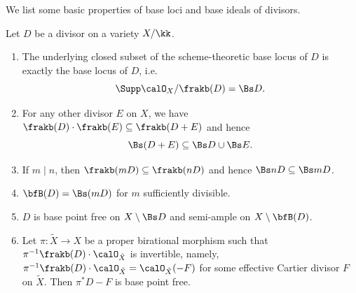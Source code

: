   We list some basic properties of base loci and base ideals of divisors.

  \begin{proposition}
    Let $D$ be a divisor on a variety $X/\kk$.
    \begin{enumerate}
      \item The underlying closed subset of the scheme-theoretic base locus of $D$ is exactly the base locus of $D$, i.e. 
        \[ \Supp \calO_X/\frakb(D) = \Bs D. \]
      \item For any other divisor $E$ on $X$, we have $\frakb(D) \cdot \frakb(E) \subseteq \frakb(D+E)$ and hence 
      \[ \Bs(D+E) \subseteq \Bs D \cup \Bs E. \]
      \item If $m \mid n$, then $\frakb(mD) \subseteq \frakb(nD)$ and hence $\Bs nD \subseteq \Bs mD$.
      \item $\bfB(D) = \Bs (mD)$ for $m$ sufficiently divisible.
      \item $D$ is base point free on $X \setminus \Bs D$ and semi-ample on $X \setminus \bfB(D)$.
      \item Let $\pi: \tilde{X} \to X$ be a proper birational morphism such that $\pi^{-1} \frakb(D) \cdot \calO_{\tilde{X}}$ is invertible, namely, $\pi^{-1} \frakb(D) \cdot \calO_{\tilde{X}} = \calO_{\tilde{X}}(-F)$ for some effective Cartier divisor $F$ on $\tilde{X}$.
      Then $\pi^* D - F$ is base point free.
    \end{enumerate}
  \end{proposition}
